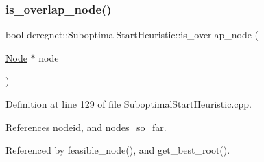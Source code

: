 \mbox{\label{classderegnet_1_1SuboptimalStartHeuristic_a911e7e3003bbf92b170a943e714b014e}} 
\subsubsection{\texorpdfstring{is\+\_\+overlap\+\_\+node()}{is\_overlap\_node()}}
{\footnotesize\ttfamily bool deregnet\+::\+Suboptimal\+Start\+Heuristic\+::is\+\_\+overlap\+\_\+node (\begin{DoxyParamCaption}\item[{\hyperlink{namespacederegnet_a744bad34f2de9856d36715a445f027f3}{Node} $\ast$}]{node }\end{DoxyParamCaption})\hspace{0.3cm}{\ttfamily [private]}}



Definition at line 129 of file Suboptimal\+Start\+Heuristic.\+cpp.



References nodeid, and nodes\+\_\+so\+\_\+far.



Referenced by feasible\+\_\+node(), and get\+\_\+best\+\_\+root().


